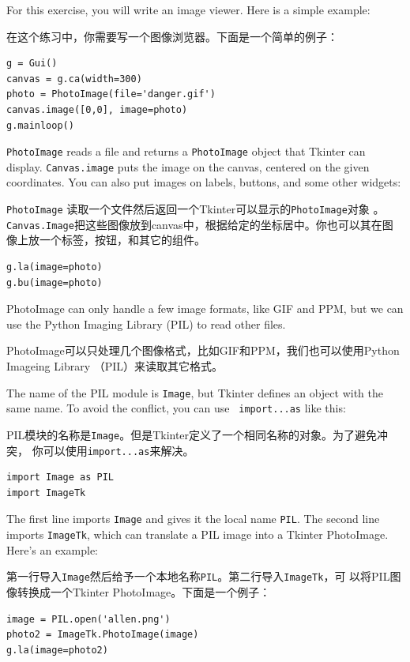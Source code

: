 \documentclass[10pt]{book}
\begin{document}
\begin{CJK}{UTF8}{gbsn}
\begin{exercise}
For this exercise, you will write an image viewer.  Here is
a simple example:

在这个练习中，你需要写一个图像浏览器。下面是一个简单的例子：

\begin{verbatim}
g = Gui()
canvas = g.ca(width=300)
photo = PhotoImage(file='danger.gif')
canvas.image([0,0], image=photo)
g.mainloop()
\end{verbatim}
%
{\tt PhotoImage} reads a file and returns a {\tt PhotoImage} object
that Tkinter can display.  {\tt Canvas.image} puts the image on the
canvas, centered on the given coordinates.  You can also put images on
labels, buttons, and some other widgets:

{\tt PhotoImage} 读取一个文件然后返回一个Tkinter可以显示的{\tt PhotoImage}对象
。{\tt Canvas.Image}把这些图像放到canvas中，根据给定的坐标居中。你也可以其在图
像上放一个标签，按钮，和其它的组件。

\begin{verbatim}
g.la(image=photo)
g.bu(image=photo)
\end{verbatim}
%
PhotoImage can only handle a few image formats, like GIF and PPM, 
but we can use the Python Imaging Library (PIL) to read other
files.

PhotoImage可以只处理几个图像格式，比如GIF和PPM，我们也可以使用Python Imageing
Library （PIL）来读取其它格式。

The name of the PIL module is {\tt Image}, but Tkinter defines an
object with the same name.  To avoid the conflict, you can use {\tt
  import...as} like this:

PIL模块的名称是{\tt Image}。但是Tkinter定义了一个相同名称的对象。为了避免冲突，
你可以使用{\tt import...as}来解决。

\begin{verbatim}
import Image as PIL
import ImageTk
\end{verbatim}
%
The first line imports {\tt Image} and
gives it the local name {\tt PIL}.  The second
line imports {\tt ImageTk}, which can translate a PIL
image into a Tkinter PhotoImage.  Here's an example:

第一行导入{\tt Image}然后给予一个本地名称{\tt PIL}。第二行导入{\tt ImageTk}，可
以将PIL图像转换成一个Tkinter PhotoImage。下面是一个例子：

\begin{verbatim}
image = PIL.open('allen.png')
photo2 = ImageTk.PhotoImage(image)
g.la(image=photo2)
\end{verbatim}
%


\end{exercise}
\end{CJK}
\end{document}
